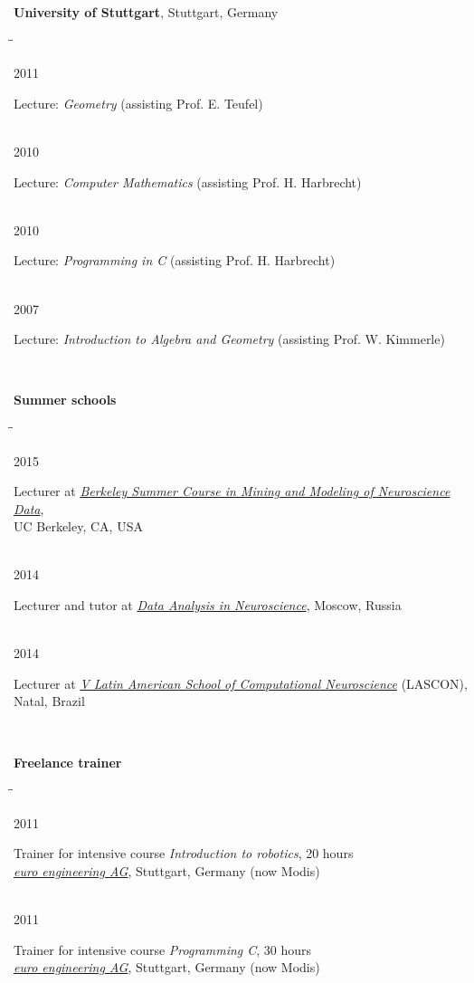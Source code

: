 \documentclass[10pt]{article} %
\newlength{\marginwidth}
\newlength{\smallertextwidth}
\newcommand{\tabbedblock}[1]{
\begin{tabbing}%
\hspace{\marginwidth}\=\hspace{\smallertextwidth}\=\kill%
#1%
\end{tabbing}
}
\newcommand{\tabitem}[2]{%
#1\>\begin{minipage}[t]{\smallertextwidth}#2\end{minipage}\\
}
\begin{document}
\textbf{University of Stuttgart}, Stuttgart, Germany
%
\tabbedblock{
  \tabitem
  {2011}
  {Lecture: \textit{Geometry} (assisting Prof. E. Teufel)}
  \tabitem
  {2010}
  {Lecture: \textit{Computer Mathematics} (assisting Prof. H. Harbrecht)}
  \tabitem
  {2010}
  {Lecture: \textit{Programming in C} (assisting Prof. H. Harbrecht)}
  \tabitem
  {2007}
  {Lecture: \textit{Introduction to Algebra and Geometry} (assisting Prof. W. Kimmerle)}
}

\textbf{Summer schools}
%
\tabbedblock{
  \tabitem
  {2015}
  {Lecturer at \href{https://crcns.org/course}{\textit{Berkeley Summer Course in Mining and Modeling of Neuroscience Data}},\\UC Berkeley, CA, USA}
  \tabitem
  {2014}
  {Lecturer and tutor at \href{http://www.neurobiotech.ru/ru/dataNS}{\textit{Data Analysis in Neuroscience}}, Moscow, Russia}
  \tabitem
  {2014}
  {Lecturer at \href{http://sisne.org/previous-editions/lascon-v/?lang=en}{\textit{V Latin American School of Computational Neuroscience}} (LASCON), Natal, Brazil}
}

\textbf{Freelance trainer}
%
\tabbedblock{
%
\tabitem
{2011}
{%
Trainer for intensive course \textit{Introduction to robotics}, 20 hours\\
\textit{\href{https://www.ee-ag.com/}{euro engineering AG}}, Stuttgart, Germany (now Modis)
}
%
\tabitem
{2011}
{%
Trainer for intensive course \textit{Programming C}, 30 hours\\
\textit{\href{https://www.ee-ag.com/}{euro engineering AG}}, Stuttgart, Germany (now Modis)
}
}

\end{document}
